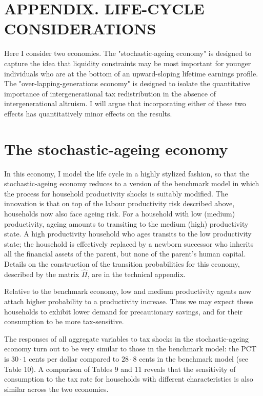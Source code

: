\documentclass[11pt]{article}
\begin{document}
\section*{APPENDIX. LIFE-CYCLE CONSIDERATIONS}
Here I consider two economies. The "stochastic-ageing economy" is designed to capture the idea that liquidity constraints may be most important for younger individuals who are at the bottom of an upward-sloping lifetime earnings profile. The "over-lapping-generations economy" is designed to isolate the quantitative importance of intergenerational tax redistribution in the absence of intergenerational altruism. I will argue that incorporating either of these two effects has quantitatively minor effects on the results.

\section*{The stochastic-ageing economy}
In this economy, I model the life cycle in a highly stylized fashion, so that the stochastic-ageing economy reduces to a version of the benchmark model in which the process for household productivity shocks is suitably modified. The innovation is that on top of the labour productivity risk described above, households now also face ageing risk. For a household with low (medium) productivity, ageing amounts to transiting to the medium (high) productivity state. A high productivity household who ages transits to the low productivity state; the household is effectively replaced by a newborn successor who inherits all the financial assets of the parent, but none of the parent's human capital. Details on the construction of the transition probabilities for this economy, described by the matrix $\hat{\Pi}$, are in the technical appendix.

Relative to the benchmark economy, low and medium productivity agents now attach higher probability to a productivity increase. Thus we may expect these households to exhibit lower demand for precautionary savings, and for their consumption to be more tax-sensitive.

The responses of all aggregate variables to tax shocks in the stochastic-ageing economy turn out to be very similar to those in the benchmark model: the PCT is $30 \cdot 1$ cents per dollar compared to $28 \cdot 8$ cents in the benchmark model (see Table 10). A comparison of Tables 9 and 11 reveals that the sensitivity of consumption to the tax rate for households with different characteristics is also similar across the two economies.
\end{document}
